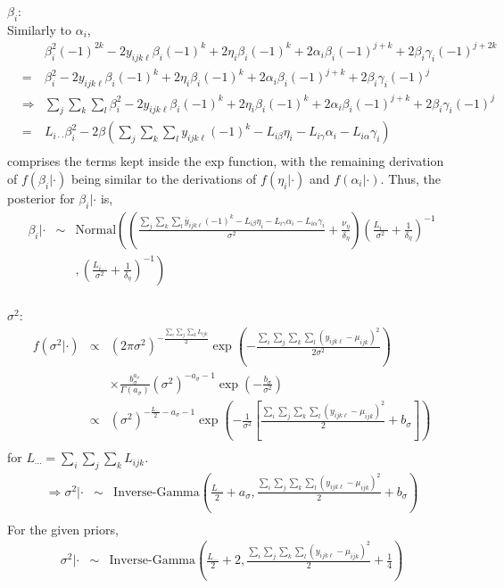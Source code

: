 $\beta_{i}$:\\
Similarly to $\alpha_i$,
\begin{eqnarray*}
&&\beta_i^2(-1)^{2k}-2y_{ijk\ell}\beta_i(-1)^k+2\eta_i\beta_i(-1)^k+2\alpha_i\beta_i(-1)^{j+k}+2\beta_i\gamma_i(-1)^{j+2k}\\
&=&\beta_i^2-2y_{ijk\ell}\beta_i(-1)^k+2\eta_i\beta_i(-1)^k+2\alpha_i\beta_i(-1)^{j+k}+2\beta_i\gamma_i(-1)^j\\
&\Rightarrow&\sum_j\sum_k\sum_l\beta_i^2-2y_{ijk\ell}\beta_i(-1)^k+2\eta_i\beta_i(-1)^k+2\alpha_i\beta_i(-1)^{j+k}+2\beta_i\gamma_i(-1)^j\\
&=&L_{i\cdot\cdot}\beta_i^2-2\beta\left(\sum_j\sum_k\sum_ly_{ijk\ell}(-1)^k-L_{i\beta}\eta_i-L_{i\gamma}\alpha_i-L_{i\alpha}\gamma_i\right)\\
\end{eqnarray*}
comprises the terms kept inside the exp function, with the remaining
derivation of $f(\beta_i|\cdot)$ being similar to the derivations of
$f(\eta_i|\cdot)$ and $f(\alpha_i|\cdot)$.  Thus, the posterior for
$\beta_i|\cdot$ is,
\begin{eqnarray*}
\beta_i|\cdot&\sim&\mbox{Normal}\left(\left(\frac{\sum_j\sum_k\sum_l\bar{y}_{ijk\ell}(-1)^k-L_{i\beta}\eta_i-L_{i\gamma}\alpha_i-L_{i\alpha}\gamma_i}{\sigma^2}+\frac{\nu_{\eta}}{\delta_{\eta}}\right)\left(\frac{L_{i\cdot\cdot}}{\sigma^2}+\frac{1}{\delta_{\eta}}\right)^{-1}\right.\\
&&\left.,\left(\frac{L_{i\cdot\cdot}}{\sigma^2}+\frac{1}{\delta_{\eta}}\right)^{-1}\right)\\
\end{eqnarray*}

$\sigma^2$:\\
\begin{eqnarray*}
f(\sigma^2|\cdot)&\propto&\left(2\pi\sigma^2\right)^{-\frac{\sum_i\sum_j\sum_kL_{ijk}}{2}}\exp\left(-\frac{\sum_i\sum_j\sum_k\sum_l\left(y_{ijk\ell}-\mu_{ijk}\right)^2}{2\sigma^2}\right)\\
&&\times\frac{b_{\sigma}^{a_{\sigma}}}{\Gamma\left(a_{\sigma}\right)}\left(\sigma^2\right)^{-a_{\sigma}-1}\exp\left(-\frac{b_{\sigma}}{\sigma^2}\right)\\
&\propto&\left(\sigma^2\right)^{-\frac{L_{\cdots}}{2}-a_{\sigma}-1}\exp\left(-\frac{1}{\sigma^2}\left[\frac{\sum_i\sum_j\sum_k\sum_l\left(y_{ijk\ell}-\mu_{ijk}\right)^2}{2}+b_{\sigma}\right]\right)\\
\end{eqnarray*}
for $L_{\cdots} = \sum_i\sum_j\sum_kL_{ijk}$.\\
\begin{eqnarray*}
\Rightarrow \sigma^2|\cdot &\sim& \mbox{Inverse-Gamma}\left(\frac{L_{\cdots}}{2}+a_{\sigma},\frac{\sum_i\sum_j\sum_k\sum_l\left(y_{ijk\ell}-\mu_{ijk}\right)^2}{2}+b_{\sigma}\right)\\
\end{eqnarray*}
For the given priors,
\begin{eqnarray*}
\sigma^2|\cdot &\sim& \mbox{Inverse-Gamma}\left(\frac{L_{\cdots}}{2}+2,\frac{\sum_i\sum_j\sum_k\sum_l\left(y_{ijk\ell}-\mu_{ijk}\right)^2}{2}+\frac{1}{4}\right)\\
\end{eqnarray*}


